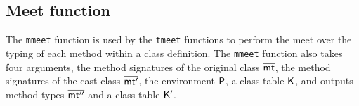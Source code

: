\documentclass[a4paper,USenglish]{tex/lipics-v2016}
\begin{document}
\begin{mathpar}

\end{mathpar}

\subsection{Meet function}\label{monmeet}

The \texttt{mmeet} function is used by the \texttt{tmeet} functions to
perform the meet over the typing of each method within a class definition.
The \texttt{mmeet} function also takes four arguments, the method
signatures of the original class $\b\mt$, the method signatures of the cast
class $\b\mtp$, the environment $\P$, a class table $\K$, and outputs method
types $\b\mtpp$ and a class table $\Kp$. \\

\end{document}
